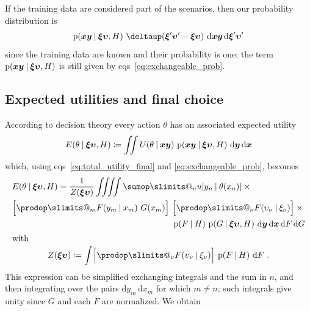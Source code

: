 \documentclass[\ifafour a4paper,12pt,\else a5paper,10pt,\fi%
onecolumn,oneside,article,%
british%
]{memoir}
\makeatletter
\theoremstyle{remark}
\theoremstyle{innote}
\def\sum{\DOTSI\sumop\slimits@}
\def\prod{\DOTSI\prodop\slimits@}
\newcommand*{\delt}{\deltaup}%
\newcommand*{\di}{\mathrm{d}}%
\newcommand*{\defd}{\coloneqq}
\newcommand*{\p}{\mathrm{p}}%
\renewcommand*{\|}[1][]{\nonscript\:#1\vert\nonscript\:\mathopen{}}
\newcommand*{\eqns}{eqs}%
\newcommand*{\xx}[1]{x_{#1}}
\newcommand*{\yy}[1]{y_{#1}}
\newcommand*{\bx}{\bm{x}}
\newcommand*{\by}{\bm{y}}
\newcommand*{\bz}{\bm{xy}}
\newcommand*{\xxx}[1]{\xi_{#1}}
\newcommand*{\yyy}[1]{\upsilon_{#1}}
\newcommand*{\bzz}{\bm{\xi\upsilon}}
\newcommand*{\bzzi}{\bm{\xi}'\bm{\upsilon}'}
\makeatother
\begin{document}
If the training data are considered part of the scenarios, then our
probability distribution is
\begin{equation}
  \label{eq:prob_distr_conditional_withtraining}
  \p(\bz \| \bzz, H)\ \delt(\bzzi-\bzz)\ \di\bz\,\di\bzzi
\end{equation}
since the training data are known and their probability is one; the term
$\p(\bz \| \bzz, H)$ is still given by \eqns~\eqref{eq:exchangeable_prob}.




\subsection{Expected utilities and final choice}
\label{sec:expect_utilities}

According to decision theory every action $\theta$ has an associated
expected utility
\begin{equation}
  \label{eq:exp_utility_theta}
  E(\theta \| \bzz, H) 
\defd \iint U(\theta \| \bz) \ \p(\bz \| \bzz, H)\ \di\by\,\di\bx
\end{equation}
which, using \eqns~\eqref{eq:total_utility_final} and
\eqref{eq:exchangeable_prob}, becomes
\begin{subequations}    \label{eq:exp_utility_replace}
  \begin{gather}
\begin{multlined}[b][0.85\linewidth]
    E(\theta \| \bzz, H) =
      \frac{1}{Z(\bzz)}\iiiint \sum_{n} u[\yy{n} \| \theta(\xx{n})]\times{}\\ 
      \shoveright{\Bigl[\prod_{m} F(\yy{m}\|\xx{m})\ G(\xx{m})\Bigr]\
      \Bigl[\prod_{\nu} F(\yyy{\nu}\|\xxx{\nu})\Bigr]\times{}}\\
      \p(F \| H)\
      \p(G \| \bzz, H)\ 
      \di\by\,\di\bx\,\di F\,\di G
    \end{multlined}
    \\\shortintertext{with}
    Z(\bzz) \defd
    \int \Bigl[\prod_{\nu} F(\yyy{\nu}\|\xxx{\nu})\Bigr]\ \p(F \| H)\ \di F \ .
  \end{gather}
\end{subequations}
This expression can be simplified exchanging integrals and the sum in $n$,
and then integrating over the pairs $\di\yy{m}\,\di\xx{m}$ for which
$m \ne n$; such integrals give unity since $G$ and each $F$ are normalized.
We obtain
\end{document}
